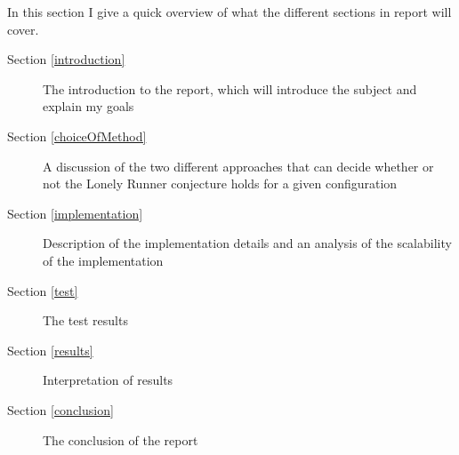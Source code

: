 In this section I give a quick overview of what the different sections in report will cover.
\begin{description}
\item[Section \ref{introduction}] The introduction to the report, which will introduce the subject and explain my goals
\item[Section \ref{choiceOfMethod}] A discussion of the two different approaches that can decide whether or not the Lonely Runner conjecture holds for a given configuration
\item[Section \ref{implementation}] Description of the implementation details and an analysis of the scalability of the implementation
\item[Section \ref{test}] The test results
\item[Section \ref{results}] Interpretation of results
\item[Section \ref{conclusion}] The conclusion of the report  
\end{description}
